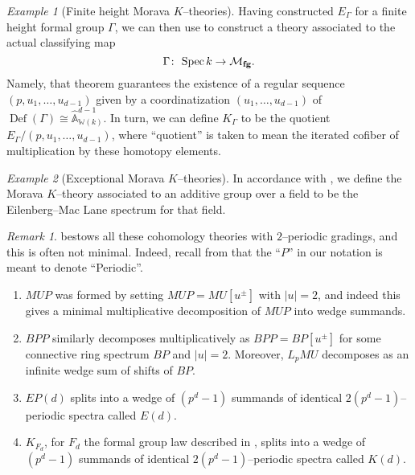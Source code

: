 \documentclass{amsart}
\newcommand{\A}{\widehat{\mathbb{A}}}
\newcommand{\W}{\mathbb W}
\newcommand{\<}{\langle}
\renewcommand{\>}{\rangle}
\newcommand{\co}{\colon\thinspace}
\newcommand{\moduli}[1]{\mathcal{M}_{\mathbf{#1}}}
\DeclareMathOperator{\Spec}{Spec}
\theoremstyle{plain}
\theoremstyle{definition}
\theoremstyle{remark}
\newtheorem*{remark}{Remark}
\newtheorem*{example}{Example}
\begin{document}
\begin{example}[Finite height Morava $K$--theories]\label{DefnKThy}
Having constructed $E_\Gamma$ for a finite height formal group $\Gamma$, we can then use  to construct a theory associated to the actual classifying map \[\Gamma \co \Spec k \to \moduli{fg}.\]  Namely, that theorem guarantees the existence of a regular sequence $(p, u_1, \ldots, u_{d-1})$ given by a coordinatization $(u_1, \ldots, u_{d-1})$ of $\operatorname{Def}(\Gamma) \cong \A^{d-1}_{\W(k)}$.  In turn, we can define $K_\Gamma$ to be the quotient $E_\Gamma / (p, u_1, \ldots, u_{d-1})$, where ``quotient'' is taken to mean the iterated cofiber of multiplication by these homotopy elements.
\end{example}

\begin{example}[Exceptional Morava $K$--theories]
In accordance with , we define the Morava $K$--theory associated to an additive group over a field to be the Eilenberg--Mac Lane spectrum for that field.
\end{example}

\begin{remark}\label{MinimalSummands}
 bestows all these cohomology theories with $2$--periodic gradings, and this is often not minimal.  Indeed, recall from  that the ``$P$'' in our notation is meant to denote ``Periodic''.
\begin{enumerate}
\item $MUP$ was formed by setting $MUP = MU[u^\pm]$ with $|u| = 2$, and indeed this gives a minimal multiplicative decomposition of $MUP$ into wedge summands.
\item $BPP$ similarly decomposes multiplicatively as $BPP = BP[u^\pm]$ for some connective ring spectrum $BP$ and $|u| = 2$.  Moreover, $L_p MU$ decomposes as an infinite wedge sum of shifts of $BP$.
\item $EP(d)$ splits into a wedge of $(p^d-1)$ summands of identical $2(p^d-1)$--periodic spectra called $E(d)$.
\item $K_{F_d}$, for $F_d$ the formal group law described in , splits into a wedge of $(p^d-1)$ summands of identical $2(p^d-1)$--periodic spectra called $K(d)$.
\end{enumerate}
\end{remark}
\end{document}
